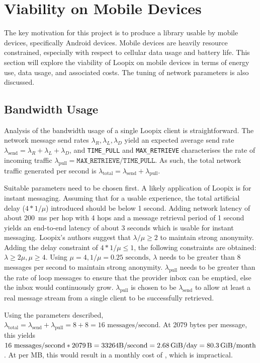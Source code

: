 \documentclass[final,dissertation.tex]{subfiles}
\begin{document}
\section{Viability on Mobile Devices}

The key motivation for this project is to produce a library usable by mobile devices, specifically Android devices. Mobile devices are heavily resource constrained, especially with respect to cellular data usage and battery life. This section will explore the viability of Loopix on mobile devices in terms of energy use, data usage, and associated costs. The tuning of network parameters is also discussed.

\subsection{Bandwidth Usage}

Analysis of the bandwidth usage of a single Loopix client is straightforward. The network message send rates $\lambda_R, \lambda_L, \lambda_D$ yield an expected average send rate $\lambda_\text{send} = \lambda_R + \lambda_L + \lambda_D$, and \verb|TIME_PULL| and \verb|MAX_RETRIEVE| characterises the rate of incoming traffic $\lambda_\text{pull} = \texttt{MAX\_RETRIEVE}/\texttt{TIME\_PULL}$. As such, the total network traffic generated per second is $\lambda_\text{total} = \lambda_\text{send} + \lambda_\text{pull}$.

Suitable parameters need to be chosen first. A likely application of Loopix is for instant messaging. Assuming that for a usable experience, the total artificial delay ($4 * 1/\mu$) introduced should be below 1 second. Adding network latency of about \SI{200}{\milli\second} per hop with 4 hops and a message retrieval period of 1 second yields an end-to-end latency of about 3 seconds which is usable for instant messaging. Loopix's authors suggest that $\lambda/\mu \ge 2$ to maintain strong anonymity. Adding the delay constraint of $4* 1/\mu \le 1$, the following constraints are obtained: $\lambda \ge 2\mu, \mu \ge 4$. Using $\mu = 4, 1/\mu = 0.25\text{ seconds}$, $\lambda$ needs to be greater than 8 messages per second to maintain strong anonymity. $\lambda_\text{pull}$ needs to be greater than the rate of loop messages to ensure that the provider inbox can be emptied, else the inbox would continuously grow. $\lambda_\text{pull}$ is chosen to be $\lambda_\text{send}$ to allow at least a real message stream from a single client to be successfully retrieved.

Using the parameters described, $\lambda_\text{total} = \lambda_\text{send} + \lambda_\text{pull} = 8 + 8 = 16\text{ messages/second}$. At 2079 bytes per message, this yields $16\text{ messages/second} * \SI{2079}{\byte} = 33264\text{B}/\text{second} = \SI{2.68}{\gibi\byte}/\text{day} = \SI{80.3}{\gibi\byte}/\text{month}$. At  per MB, this would result in a monthly cost of , which is impractical.
\end{document}
